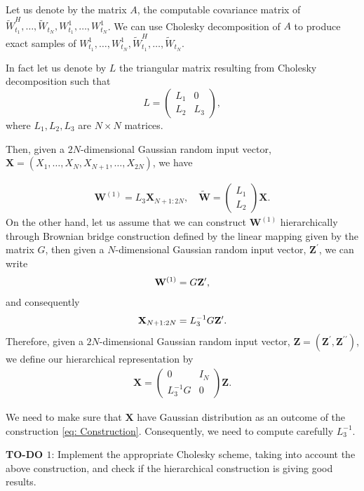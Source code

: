 Let us denote by the matrix $A$, the computable covariance matrix of  $ \widetilde{W}^H_{t_1},\dots, \widetilde{W}_{t_N},W^1_{t_1},\dots, W^1_{t_N}$.  We can use Cholesky decomposition of $A$ to produce exact samples of $W^1_{t_1},\dots, W^1_{t_N}, \widetilde{W}^H_{t_1},\dots, \widetilde{W}_{t_N}$.

In fact let us denote by $L$ the triangular matrix resulting from Cholesky decomposition such that 
\[
L=
\left(
\begin{array}{c|c}
L_1& 0 \\
L_2 & L_3
\end{array}
\right),
\]
where $L_1, L_2,L_3$ are $N \times N$ matrices.

Then, given  a $2 N$-dimensional Gaussian random input vector, $\mathbf{X}=(X_1, \dots,X_N, X_{N+1}, \dots, X_{2N})$, we have

\begin{align}
\mathbf{W}^{(1)}=L_3 \mathbf{X}_{N+1:2N}, \quad \widetilde{\mathbf{W}}= 
\left(
\begin{array}{c}
L_1 \\
L_2 
\end{array}
\right) \mathbf{X}.
\end{align}
On the other hand, let us assume that we can construct $\mathbf{W}^{(1)}$ hierarchically  through  Brownian bridge construction defined by the linear mapping given by the matrix $G$, then given a $ N$-dimensional Gaussian random input vector, $\mathbf{Z}^\prime$, we can write
\begin{align*}
\mathbf{W}^{(1)}=G  \mathbf{Z}^\prime ,
\end{align*}
and consequently
\begin{align*}
 \mathbf{X}_{N+1:2N}= L_3^{-1} G  \mathbf{Z}^\prime .
\end{align*}
Therefore, given a $2 N$-dimensional Gaussian random input vector, $\mathbf{Z}=(\mathbf{Z}^\prime,\mathbf{Z}^{\prime \prime})$, we define our hierarchical representation by
\begin{align}\label{eq: Construction}
\mathbf{X}=\left(
\begin{array}{c|c}
0 & I_{N} \\
L_3^{-1} G & 0
\end{array}
\right) \mathbf{Z}.
\end{align}

We need to make sure that $\mathbf{X}$  have Gaussian distribution as an outcome of the construction \eqref{eq: Construction}. Consequently, we need to compute carefully $L_3^{-1}$.



\textbf{TO-DO $1$}: Implement the appropriate Cholesky scheme, taking into account the above construction, and check if the hierarchical construction is giving good results.

